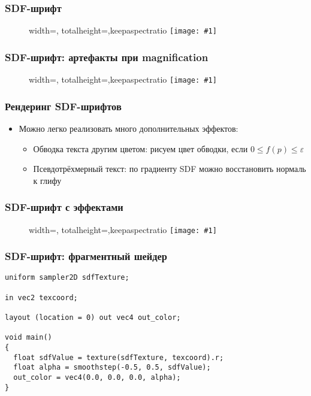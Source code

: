 \documentclass{beamer}
\newcommand{\slideimage}[1]{
  \begin{figure}
    \begin{adjustbox}{width=\textwidth, totalheight=\textheight-2\baselineskip-2\baselineskip,keepaspectratio}
      \texttt{[image: \#1]}
    \end{adjustbox}
  \end{figure}
}
\begin{document}
\begin{frame}[fragile]
\frametitle{SDF-шрифт}
\slideimage{sdf-font.png}
\end{frame}

\begin{frame}[fragile]
\frametitle{SDF-шрифт: артефакты при magnification}
\slideimage{sdf-artifacts.jpg}
\end{frame}

\begin{frame}[fragile]
\frametitle{Рендеринг SDF-шрифтов}
\begin{itemize}
\item Можно легко реализовать много дополнительных эффектов:
\pause
\begin{itemize}
\item Обводка текста другим цветом: рисуем цвет обводки, если \begin{math}0 \leq f(p) \leq \varepsilon\end{math}
\pause
\item Псевдотрёхмерный текст: по градиенту SDF можно восстановить нормаль к глифу
\end{itemize}
\end{itemize}
\end{frame}

\begin{frame}[fragile]
\frametitle{SDF-шрифт с эффектами}
\slideimage{sdf-effects.png}
\end{frame}

\begin{frame}[fragile]
\frametitle{SDF-шрифт: фрагментный шейдер}
\fontsize{10pt}{10pt}
\begin{verbatim}
uniform sampler2D sdfTexture;

in vec2 texcoord;

layout (location = 0) out vec4 out_color;

void main()
{
  float sdfValue = texture(sdfTexture, texcoord).r;
  float alpha = smoothstep(-0.5, 0.5, sdfValue);
  out_color = vec4(0.0, 0.0, 0.0, alpha);
}
\end{verbatim}
\end{frame}
\end{document}
